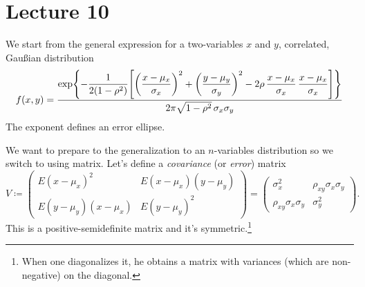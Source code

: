 
\chapter{Lecture 10}

We start from the general expression for a two-variables $x$ and $y$, correlated, Gau\ss{}ian distribution
\begin{equation}
	f(x,y) = \frac{\displaystyle\exp\gp*{-\frac{1}{2(1-\rho^2)}
			\qp*{\left(\frac{x-\mu_x}{\sigma_x}\right)^2+
				\left(\frac{y-\mu_y}{\sigma_y}\right)^2
	-2\rho\,\frac{x-\mu_x}{\sigma_x}\,\frac{x-\mu_x}{\sigma_x}}}}{2\pi\sqrt{1-\rho^2}\,\sigma_x\sigma_y}
\end{equation}
The exponent defines an error ellipse.


We want to prepare to the generalization to an $n$-variables distribution so we switch to using matrix.
Let's define a \emph{covariance} (or \emph{error}) matrix
\begin{equation}
	V\coloneqq 
	\begin{pmatrix}
		E(x-\mu_x)^2	&E(x-\mu_x)(y-\mu_y)\\
		E(y-\mu_y)(x-\mu_x) & E(y-\mu_y)^2
	\end{pmatrix}
	=
	\begin{pmatrix}
		\sigma_x^2	&\rho_{xy}\sigma_x\sigma_y\\
		\rho_{xy}\sigma_x\sigma_y &\sigma_y^2
	\end{pmatrix}.
\end{equation}
This is a positive-semidefinite matrix and it's symmetric.\footnote{When one diagonalizes it, he obtains a matrix with variances (which are non-negative) on the diagonal.}

